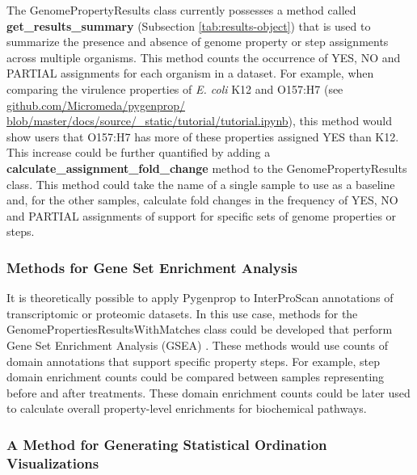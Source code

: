 The GenomePropertyResults class currently possesses a method called \textbf{get\_results\_summary} (Subsection \ref{tab:results-object}) that is used to summarize the presence and absence of genome property or step assignments across multiple organisms. This method counts the occurrence of YES, NO and PARTIAL assignments for each organism in a dataset. For example, when comparing the virulence properties of \textit{E. coli} K12 and O157:H7 (see \href{github.com/Micromeda/pygenprop/blob/master/docs/source/\_static/tutorial/tutorial.ipynb}{github.com/Micromeda/pygenprop/ \\blob/master/docs/source/\_static/tutorial/tutorial.ipynb}), this method would show users that O157:H7 has more of these properties assigned YES than K12. This increase could be further quantified by adding a \textbf{calculate\_assignment\_fold\_change} method to the GenomePropertyResults class. This method could take the name of a single sample to use as a baseline and, for the other samples, calculate fold changes in the frequency of YES, NO and PARTIAL assignments of support for specific sets of genome properties or steps.

\subsubsection{Methods for Gene Set Enrichment Analysis}

It is theoretically possible to apply Pygenprop to InterProScan annotations of transcriptomic \cite{wang2009rna} or proteomic \cite{phizicky2003protein} datasets. In this use case, methods for the GenomePropertiesResultsWithMatches class could be developed that perform Gene Set Enrichment Analysis (GSEA) \cite{subramanian2005gene}. These methods would use counts of domain annotations that support specific property steps. For example, step domain enrichment counts could be compared between samples representing before and after treatments. These domain enrichment counts could be later used to calculate overall property-level enrichments for biochemical pathways.

\subsubsection{A Method for Generating Statistical Ordination Visualizations}

